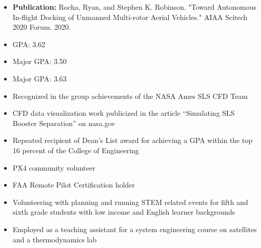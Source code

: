 
\begin{itemize}
  \item \textbf{Publication:} Rocha, Ryan, and Stephen K. Robinson. "Toward Autonomous In-flight Docking of Unmanned Multi-rotor Aerial Vehicles." AIAA Scitech 2020 Forum. 2020.
  \item GPA: 3.62
\end{itemize}
\divider

\begin{itemize}
  \item Major GPA: 3.50
\end{itemize}
\smallskip
{}
\begin{itemize}
  \item Major GPA: 3.63
\end{itemize}

\par\medskip
{}
\par\medskip
{}

\begin{itemize}
    \item Recognized in the group achievements of the NASA Ames SLS CFD Team
    \item CFD data visualization work publicized in the article “Simulating SLS Booster Separation” on nasa.gov
    \item Repeated recipient of Dean’s List award for achieving a GPA within the top 16 percent of the College of Engineering
\end{itemize}

\begin{itemize}
    \item PX4 community volunteer
    \item FAA Remote Pilot Certification holder
    \item Volunteering with planning and running STEM related events for fifth and sixth grade students with low income and English learner backgrounds 
    \item Employed as a teaching assistant for a system engineering course on satellites and a thermodynamics lab
\end{itemize}